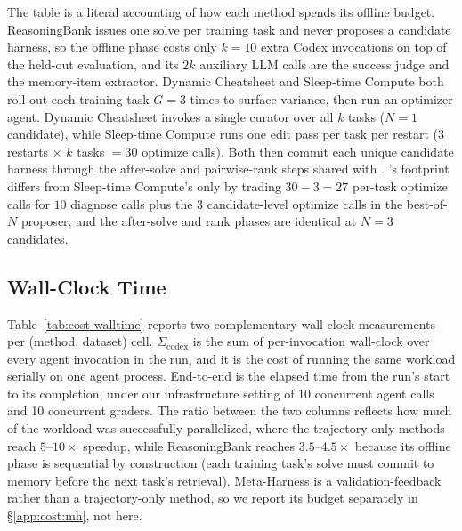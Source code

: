 The table is a literal accounting of how each method spends its offline budget.
ReasoningBank issues one solve per training task and never proposes a candidate harness, so the offline phase costs only $k=10$ extra Codex invocations on top of the held-out evaluation, and its $2k$ auxiliary LLM calls are the success judge and the memory-item extractor.
Dynamic Cheatsheet and Sleep-time Compute both roll out each training task $G=3$ times to surface variance, then run an optimizer agent. Dynamic Cheatsheet invokes a single curator over all $k$ tasks ($N{=}1$ candidate), while Sleep-time Compute runs one edit pass per task per restart (3 restarts $\times$ $k$ tasks $=30$ optimize calls).
Both then commit each unique candidate harness through the after-solve and pairwise-rank steps shared with \method{}.
\method{}'s footprint differs from Sleep-time Compute's only by trading $30-3=27$ per-task optimize calls for $10$ diagnose calls plus the $3$ candidate-level optimize calls in the best-of-$N$ proposer, and the after-solve and rank phases are identical at $N=3$ candidates.

\subsection{Wall-Clock Time}

 Table~\ref{tab:cost-walltime} reports two complementary wall-clock measurements per (method, dataset) cell.
$\Sigma_{\mathrm{codex}}$ is the sum of per-invocation wall-clock over every agent invocation in the run, and it is the cost of running the same workload serially on one agent process.
End-to-end is the elapsed time from the run's start to its completion, under our infrastructure setting of 10 concurrent agent calls and 10 concurrent graders.
The ratio between the two columns reflects how much of the workload was successfully parallelized, where the trajectory-only methods reach $5$--$10\times$ speedup, while ReasoningBank reaches $3.5$--$4.5\times$ because its offline phase is sequential by construction (each training task's solve must commit to memory before the next task's retrieval).
Meta-Harness is a validation-feedback rather than a trajectory-only method, so we report its budget separately in \S\ref{app:cost:mh}, not here.

